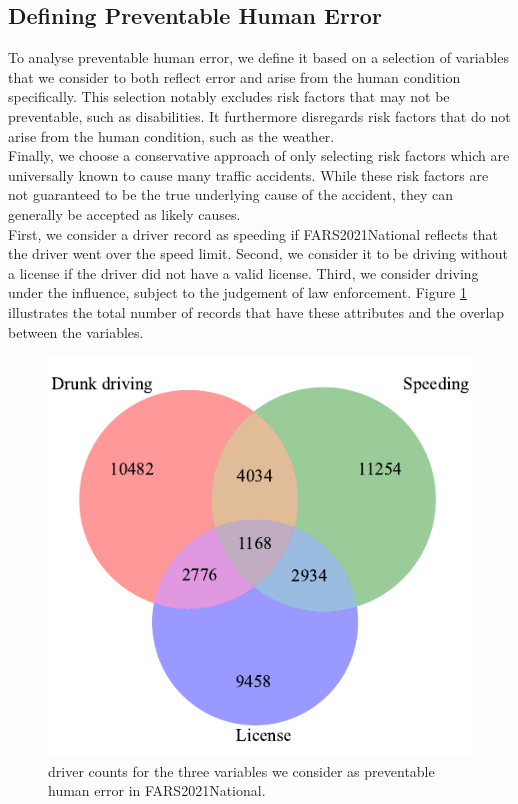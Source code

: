 \documentclass{article}
\theoremstyle{plain}
\theoremstyle{definition}
\theoremstyle{remark}
\begin{document}
\subsection{Defining Preventable Human Error}
To analyse preventable human error, we define it based on a selection of variables that we consider to both reflect error and arise from the human condition specifically. This selection notably excludes risk factors that may not be preventable, such as disabilities. It furthermore disregards risk factors that do not arise from the human condition, such as the weather.\\
Finally, we choose a conservative approach of only selecting risk factors which are universally known to cause many traffic accidents. While these risk factors are not guaranteed to be the true underlying cause of the accident, they can generally be accepted as likely causes.
\\
First, we consider a driver record as speeding if FARS2021National reflects that the driver went over the speed limit. Second, we consider it to be driving without a license if the driver did not have a valid license. Third, we consider driving under the influence, subject to the judgement of law enforcement. Figure \ref{fig:drivers-err-overlap} illustrates the total number of records that have these attributes and the overlap between the variables.\\

\begin{figure}[ht]
	\vskip 0.2in
	\begin{center}
		\centerline{\includegraphics[width=0.49\columnwidth]{plots/drivers-err-overlap}}
		\caption{driver counts for the three variables we consider as preventable human error in FARS2021National.}
		\label{fig:drivers-err-overlap}
	\end{center}
	\vskip -0.2in
\end{figure}
\end{document}
